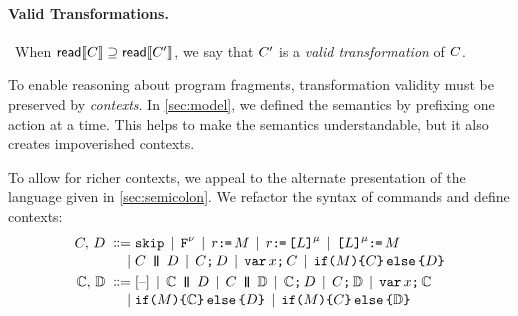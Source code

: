 \paragraph{Valid Transformations.}
\ When ${\mathsf{read}}\llbracket C\rrbracket \supseteq {\mathsf{read}}\llbracket C'\rrbracket$, we say that $C'$ is
a \emph{valid transformation} of $C$.

To enable reasoning about program fragments, transformation validity must be
preserved by \emph{contexts}.  In \textsection\ref{sec:model}, we defined the
semantics by prefixing one action at a time.  This helps to make the
semantics understandable, but it also creates impoverished contexts.

To allow for richer contexts, we appeal to the alternate presentation of the
language given in \textsection\ref{sec:semicolon}.  We refactor the syntax
of commands and define contexts:
\begin{align*}
  \aCmd,\,\bCmd
  \BNFDEF& \SKIP
  \mkern-2mu\BNFSEP\mkern-2mu \FENCE^{\fmode}
  \mkern-2mu\BNFSEP\mkern-2mu \aReg\GETS\aExp
  \mkern-2mu\BNFSEP\mkern-2mu \aReg\GETS \REF{\cExp}^{\amode} 
  \mkern-2mu\BNFSEP\mkern-2mu \REF{\cExp}^{\amode}\GETS\aExp
  \\[-.5ex]
  \BNFSEP&\aCmd \PAR \bCmd
  \mkern-2mu\BNFSEP\mkern-2mu\aCmd \SEMI \bCmd
  \mkern-2mu\BNFSEP\mkern-2mu \VAR\aLoc\SEMI \aCmd
  \mkern-2mu\BNFSEP\mkern-2mu \IF{\aExp} \THEN \aCmd \ELSE \bCmd \FI
  \\
  \aCtxt,\,\bCtxt
  \BNFDEF& \hole{}
  \mkern-2mu\BNFSEP\mkern-2mu \aCtxt \PAR \bCmd
  \mkern-2mu\BNFSEP\mkern-2mu \aCmd \PAR \bCtxt
  \mkern-2mu\BNFSEP\mkern-2mu \aCtxt \SEMI \bCmd
  \mkern-2mu\BNFSEP\mkern-2mu \aCmd \SEMI \bCtxt
  \mkern-2mu\BNFSEP\mkern-2mu \VAR\aLoc\SEMI \aCtxt
  \\[-.5ex]
  \BNFSEP& \IF{\aExp} \THEN \aCtxt \ELSE \bCmd \FI
  \mkern-2mu\BNFSEP\mkern-2mu \IF{\aExp} \THEN \aCmd \ELSE \bCtxt \FI
\end{align*}


